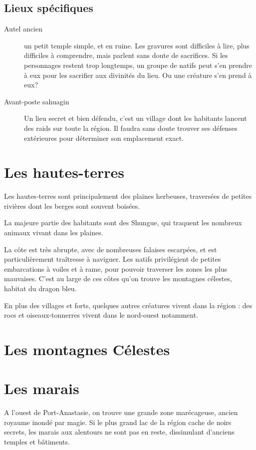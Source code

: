 \documentclass[10pt,a4paper]{book}
\begin{document}
\subsection{Lieux spécifiques}
\begin{description}
\item[Autel ancien] un petit temple simple, et en ruine. Les gravures sont difficiles à lire, plus difficiles à comprendre, mais parlent sans doute de sacrifices. Si les personnages restent trop longtemps, un groupe de natifs peut s'en prendre à eux pour les sacrifier aux divinités du lieu. Ou une créature s'en prend à eux?
\item[Avant-poste sahuagin] Un lieu secret et bien défendu, c'est un village dont les habitants lancent des raids sur toute la région. Il faudra sans doute trouver ses défenses extérieures pour déterminer son emplacement exact.
\item[]
\end{description}
\section{Les hautes-terres}
Les hautes-terres sont principalement des plaines herbeuses, traversées de petites rivières dont les berges sont souvent boisées.

La majeure partie des habitants sont des Shungue, qui traquent les nombreux animaux vivant dans les plaines.

La côte est très abrupte, avec de nombreuses falaises escarpées, et est particulièrement traîtresse à naviguer. Les natifs privilégient de petites embarcations à voiles et à rame, pour pouvoir traverser les zones les plus mauvaises. C'est au large de ces côtes qu'on trouve les montagnes célestes, habitat du dragon bleu.

En plus des villages et forts, quelques autres créatures vivent dans la région : des rocs et oiseaux-tonnerres vivent dans le nord-ouest notamment.

\section{Les montagnes Célestes}

\section{Les marais}
A l'ouest de Port-Anastasie, on trouve une grande zone marécageuse, ancien royaume inondé par magie. Si le plus grand lac de la région cache de noirs secrets, les marais aux alentours ne sont pas en reste, dissimulant d'anciens temples et bâtiments.
\end{document}
